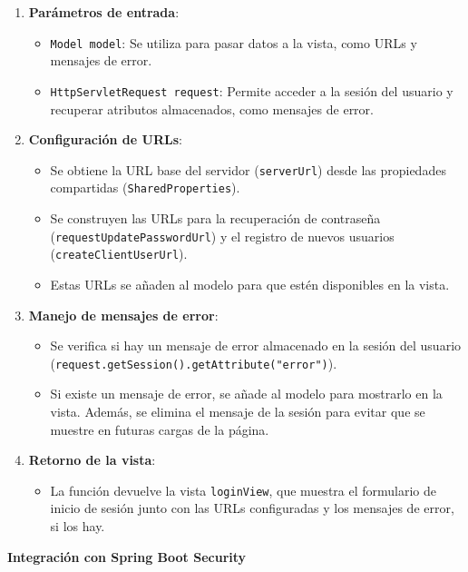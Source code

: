 \documentclass[draft]{scrbook}
\begin{document}
\begin{enumerate}
    \item \textbf{Parámetros de entrada}:
    \begin{itemize}
        \item \texttt{Model model}: Se utiliza para pasar datos a la vista, como URLs y mensajes de error.
        \item \texttt{HttpServletRequest request}: Permite acceder a la sesión del usuario y recuperar atributos almacenados, como mensajes de error.
    \end{itemize}

    \item \textbf{Configuración de URLs}:
    \begin{itemize}
        \item Se obtiene la URL base del servidor (\texttt{serverUrl}) desde las propiedades compartidas (\texttt{SharedProperties}).
        \item Se construyen las URLs para la recuperación de contraseña (\texttt{requestUpdatePasswordUrl}) y el registro de nuevos usuarios (\texttt{createClientUserUrl}).
        \item Estas URLs se añaden al modelo para que estén disponibles en la vista.
    \end{itemize}

    \item \textbf{Manejo de mensajes de error}:
    \begin{itemize}
        \item Se verifica si hay un mensaje de error almacenado en la sesión del usuario (\texttt{request.getSession().getAttribute("error")}).
        \item Si existe un mensaje de error, se añade al modelo para mostrarlo en la vista. Además, se elimina el mensaje de la sesión para evitar que se muestre en futuras cargas de la página.
    \end{itemize}

    \item \textbf{Retorno de la vista}:
    \begin{itemize}
        \item La función devuelve la vista \texttt{loginView}, que muestra el formulario de inicio de sesión junto con las URLs configuradas y los mensajes de error, si los hay.
    \end{itemize}
\end{enumerate}

\textbf{Integración con Spring Boot Security}
\end{document}
